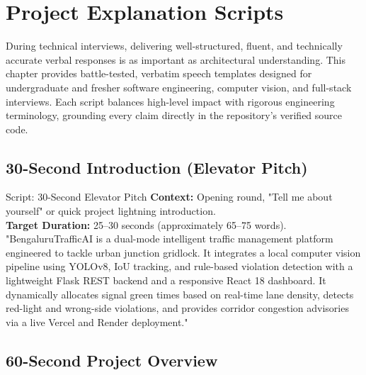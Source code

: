 \chapter{Project Explanation Scripts}
\label{ch:explanation_scripts}

During technical interviews, delivering well-structured, fluent, and technically accurate verbal responses is as important as architectural understanding. This chapter provides battle-tested, verbatim speech templates designed for undergraduate and fresher software engineering, computer vision, and full-stack interviews. Each script balances high-level impact with rigorous engineering terminology, grounding every claim directly in the repository's verified source code.

\section{30-Second Introduction (Elevator Pitch)}
\label{sec:script_30s}

\begin{interviewq}{Script: 30-Second Elevator Pitch}
\textbf{Context:} Opening round, "Tell me about yourself" or quick project lightning introduction.\\
\textbf{Target Duration:} 25--30 seconds (approximately 65--75 words).
\tcblower
"BengaluruTrafficAI is a dual-mode intelligent traffic management platform engineered to tackle urban junction gridlock. It integrates a local computer vision pipeline using YOLOv8, IoU tracking, and rule-based violation detection with a lightweight Flask REST backend and a responsive React 18 dashboard. It dynamically allocates signal green times based on real-time lane density, detects red-light and wrong-side violations, and provides corridor congestion advisories via a live Vercel and Render deployment."
\end{interviewq}

\section{60-Second Project Overview}
\label{sec:script_60s}

